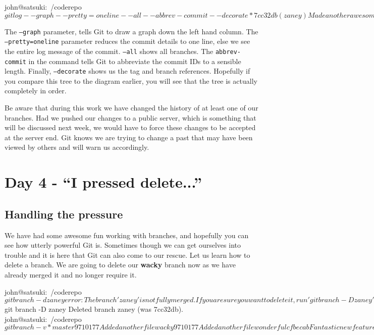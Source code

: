 \begin{code}
john@satsuki:~/coderepo$ git log --graph --pretty=oneline --all --abbrev-commit  --decorate
* 7cc32db (zaney) Made another awesome change
* a27d49e Made an awesome change
| * cfbecab (wonderful) Fantastic new feature
|/
* 9710177 (HEAD, wacky, master) Added another file
* 55fb69f (v2.0) Added two new files
* 4a155e4 Removed a few files
* a022d4d (tag: v1.0b, v1.0a) Messed with a few files
* 9938a0c Finished adding initial files
* 163f061 (v0.9) Made a few changes to first and second files
* cfe23cb My First Ever Commit
john@satsuki:~/coderepo$
\end{code}

The \texttt{--graph} parameter, tells Git to draw a graph down the left hand column.
The \texttt{--pretty=oneline} parameter reduces the commit details to one line, else we see the entire log message of the commit.
\texttt{--all} shows all branches.
The \texttt{abbrev-commit} in the command tells Git to abbreviate the commit IDs to a sensible length.
Finally, \texttt{--decorate} shows us the tag and branch references.
Hopefully if you compare this tree to the diagram earlier, you will see that the tree is actually completely in order.

Be aware that during this work we have changed the history of at least one of our branches.
Had we pushed our changes to a public server, which is something that will be discussed next week, we would have to force these changes to be accepted at the server end.
Git knows we are trying to change a past that may have been viewed by others and will warn us accordingly.

\section{Day 4 - ``I pressed delete...''}
\subsection{Handling the pressure}
We have had some awesome fun working with branches, and hopefully you can see how utterly powerful Git is.
Sometimes though we can get ourselves into trouble and it is here that Git can also come to our rescue.
Let us learn how to delete a branch.
We are going to delete our \textbf{wacky} branch now as we have already merged it and no longer require it.

\begin{code}
john@satsuki:~/coderepo$ git branch -d zaney
error: The branch 'zaney' is not fully merged.
If you are sure you want to delete it, run 'git branch -D zaney'.
john@satsuki:~/coderepo$ git branch -D zaney
Deleted branch zaney (was 7cc32db).
john@satsuki:~/coderepo$ git branch -v
* master    9710177 Added another file
  wacky     9710177 Added another file
  wonderful cfbecab Fantastic new feature
john@satsuki:~/coderepo$
\end{code}

